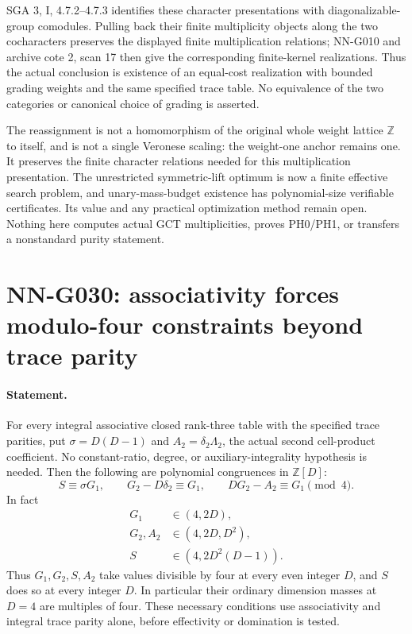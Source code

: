 SGA 3, I, 4.7.2--4.7.3 identifies these character
presentations with diagonalizable-group comodules.
Pulling back their finite multiplicity objects along
the two cocharacters preserves the displayed finite
multiplication relations; NN-G010 and archive cote 2,
scan 17 then give the corresponding finite-kernel
realizations. Thus the actual conclusion is existence
of an equal-cost realization with bounded grading
weights and the same specified trace table. No equivalence
of the two categories or canonical choice of grading
is asserted.

The reassignment is not a homomorphism of the original
whole weight lattice $\mathbb Z$ to itself, and is not
a single Veronese scaling: the weight-one anchor remains
one. It preserves the finite character relations needed
for this multiplication presentation. The unrestricted
symmetric-lift optimum is now a finite effective search
problem, and unary-mass-budget existence has polynomial-size
verifiable certificates. Its value and any practical
optimization method remain open. Nothing here computes actual GCT multiplicities,
proves PH0/PH1, or transfers a nonstandard purity statement.



\section{NN-G030: associativity forces modulo-four constraints beyond trace parity}
\paragraph{Statement.}
For every integral associative closed rank-three table with
the specified trace parities, put $\sigma=D(D-1)$ and
$A_2=\delta_2\Lambda_2$, the actual second cell-product
coefficient. No constant-ratio, degree, or auxiliary-integrality
hypothesis is needed. Then the following are polynomial
congruences in $\mathbb Z[D]$:
\[
 S\equiv\sigma G_1,\qquad
 G_2-D\delta_2\equiv G_1,\qquad
 DG_2-A_2\equiv G_1\pmod4.                           \tag{G030.1}
\]
In fact
\[
 \begin{aligned}
 G_1&\in(4,2D),\\
 G_2,A_2&\in(4,2D,D^2),\\
 S&\in(4,2D^2(D-1)).
 \end{aligned}                                                       \tag{G030.2}
\]
Thus $G_1,G_2,S,A_2$ take values divisible by four
at every even integer $D$, and $S$ does so at every
integer $D$. In particular their ordinary dimension
masses at $D=4$ are multiples of four.
These necessary conditions use associativity and
integral trace parity alone, before effectivity or
domination is tested.

